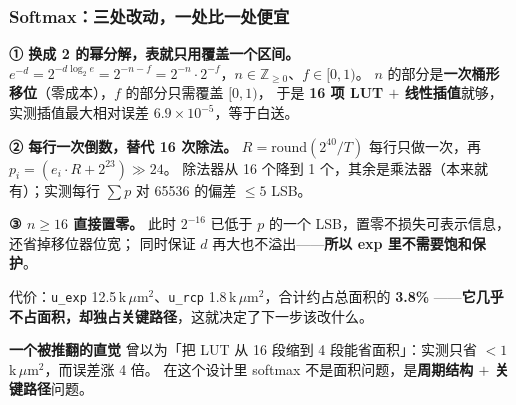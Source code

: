 \documentclass[10pt,aspectratio=43,mathserif]{beamer}
\begin{document}
\begin{frame}[t]
\frametitle{\textbf{Softmax：三处改动，一处比一处便宜}}
\footnotesize
\textbf{① 换成 2 的幂分解，表就只用覆盖一个区间。}\;
$e^{-d}=2^{-d\log_2 e}=2^{-n-f}=2^{-n}\cdot2^{-f}$，$n\in\mathbb{Z}_{\ge0}$、$f\in[0,1)$。
$n$ 的部分是\textbf{一次桶形移位}（零成本），$f$ 的部分只需覆盖 $[0,1)$，
于是 \textbf{16 项 LUT $+$ 线性插值}就够，实测插值最大相对误差 $6.9\times10^{-5}$，等于白送。
\vspace{1.5mm}

\textbf{② 每行一次倒数，替代 16 次除法。}\;
$R=\mathrm{round}(2^{40}/T)$ 每行只做一次，再 $p_i=(e_i\cdot R+2^{23})\gg24$。
除法器从 16 个降到 1 个，其余是乘法器（本来就有）；实测每行 $\sum p$ 对 65536 的偏差 $\le5$ LSB。
\vspace{1.5mm}

\textbf{③ $n\ge16$ 直接置零。}\;
此时 $2^{-16}$ 已低于 $p$ 的一个 LSB，置零不损失可表示信息，还省掉移位器位宽；
同时保证 $d$ 再大也不溢出——\textbf{所以 exp 里不需要饱和保护}。
\vspace{1.5mm}

代价：\texttt{u\_exp} 12.5\,k\,$\mu$m$^2$、\texttt{u\_rcp} 1.8\,k\,$\mu$m$^2$，合计约占总面积的 \textbf{3.8\%}
——\textbf{它几乎不占面积，却独占关键路径}，这就决定了下一步该改什么。
\vspace{1mm}
\begin{block}{\textbf{\footnotesize 一个被推翻的直觉}}
  \footnotesize
  曾以为「把 LUT 从 16 段缩到 4 段能省面积」：实测只省 $<1$\,k\,$\mu$m$^2$，而误差涨 4 倍。
  在这个设计里 softmax 不是面积问题，是\textbf{周期结构 $+$ 关键路径}问题。
\end{block}
\end{frame}
\end{document}
